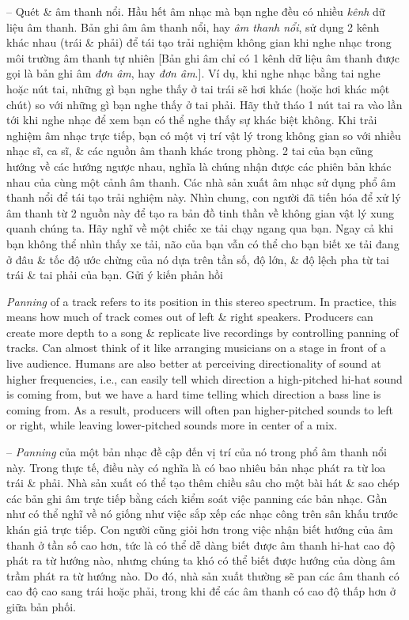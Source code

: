 \documentclass{article}
\begin{document}
\begin{itemize}
\begin{itemize}
\begin{itemize}
			-- Quét \& âm thanh nổi. Hầu hết âm nhạc mà bạn nghe đều có nhiều {\it kênh} dữ liệu âm thanh. Bản ghi âm âm thanh nổi, hay {\it âm thanh nổi}, sử dụng 2 kênh khác nhau (trái \& phải) để tái tạo trải nghiệm không gian khi nghe nhạc trong môi trường âm thanh tự nhiên [Bản ghi âm chỉ có 1 kênh dữ liệu âm thanh được gọi là bản ghi âm {\it đơn âm}, hay {\it đơn âm}.]. Ví dụ, khi nghe nhạc bằng tai nghe hoặc nút tai, những gì bạn nghe thấy ở tai trái sẽ hơi khác (hoặc hơi khác một chút) so với những gì bạn nghe thấy ở tai phải. Hãy thử tháo 1 nút tai ra vào lần tới khi nghe nhạc để xem bạn có thể nghe thấy sự khác biệt không. Khi trải nghiệm âm nhạc trực tiếp, bạn có một vị trí vật lý trong không gian so với nhiều nhạc sĩ, ca sĩ, \& các nguồn âm thanh khác trong phòng.
			2 tai của bạn cũng hướng về các hướng ngược nhau, nghĩa là chúng nhận được các phiên bản khác nhau của cùng một cảnh âm thanh. Các nhà sản xuất âm nhạc sử dụng phổ âm thanh nổi để tái tạo trải nghiệm này. Nhìn chung, con người đã tiến hóa để xử lý âm thanh từ 2 nguồn này để tạo ra bản đồ tinh thần về không gian vật lý xung quanh chúng ta. Hãy nghĩ về một chiếc xe tải chạy ngang qua bạn. Ngay cả khi bạn không thể nhìn thấy xe tải, não của bạn vẫn có thể cho bạn biết xe tải đang ở đâu \& tốc độ ước chừng của nó dựa trên tần số, độ lớn, \& độ lệch pha từ tai trái \& tai phải của bạn.
			Gửi ý kiến phản hồi
			
			{\it Panning} of a track refers to its position in this stereo spectrum. In practice, this means how much of track comes out of left \& right speakers. Producers can create more depth to a song \& replicate live recordings by controlling panning of tracks. Can almost think of it like arranging musicians on a stage in front of a live audience. Humans are also better at perceiving directionality of sound at higher frequencies, i.e., can easily tell which direction a high-pitched hi-hat sound is coming from, but we have a hard time telling which direction a bass line is coming from. As a result, producers will often pan  higher-pitched sounds to left or right, while leaving lower-pitched sounds more in center of a mix.
			
			-- {\it Panning} của một bản nhạc đề cập đến vị trí của nó trong phổ âm thanh nổi này. Trong thực tế, điều này có nghĩa là có bao nhiêu bản nhạc phát ra từ loa trái \& phải. Nhà sản xuất có thể tạo thêm chiều sâu cho một bài hát \& sao chép các bản ghi âm trực tiếp bằng cách kiểm soát việc panning các bản nhạc. Gần như có thể nghĩ về nó giống như việc sắp xếp các nhạc công trên sân khấu trước khán giả trực tiếp. Con người cũng giỏi hơn trong việc nhận biết hướng của âm thanh ở tần số cao hơn, tức là có thể dễ dàng biết được âm thanh hi-hat cao độ phát ra từ hướng nào, nhưng chúng ta khó có thể biết được hướng của dòng âm trầm phát ra từ hướng nào. Do đó, nhà sản xuất thường sẽ pan các âm thanh có cao độ cao sang trái hoặc phải, trong khi để các âm thanh có cao độ thấp hơn ở giữa bản phối.
			

\end{itemize}
\end{itemize}
\end{itemize}
\end{document}
